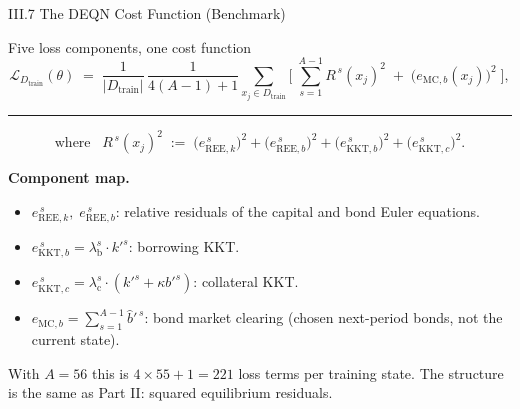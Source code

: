 \documentclass[aspectratio=169,11pt]{beamer}
\newcommand{\emphc}[1]{\textcolor{harvardcrimson}{#1}}
\newcommand{\Loss}{\mathcal{L}}
\begin{document}
\begin{frame}{III.7 The DEQN Cost Function (Benchmark)}
\footnotesize
\begin{block}{Five loss components, one cost function}
\vspace{-2pt}
\[
\Loss_{D_{\text{train}}}(\theta) \;=\; \frac{1}{|D_{\text{train}}|}\,\frac{1}{4(A-1)+1}\!
\sum_{x_j \in D_{\text{train}}}\!\Biggl[\;\sum_{s=1}^{A-1} R^{\,s}(x_j)^2 \;+\; \bigl(e_{\text{MC},b}(x_j)\bigr)^2\;\Biggr],
\]

\vspace{4pt}
\hrule
\vspace{4pt}
\[
\text{where}\;\;\;R^{\,s}(x_j)^2 \;:=\; \bigl(e_{\text{REE},k}^{\,s}\bigr)^2 + \bigl(e_{\text{REE},b}^{\,s}\bigr)^2 + \bigl(e_{\text{KKT},b}^{\,s}\bigr)^2 + \bigl(e_{\text{KKT},c}^{\,s}\bigr)^2.
\]
\vspace{-4pt}
\end{block}

\vspace{-2pt}
\textbf{Component map.}
\begin{itemize}\itemsep0pt
    \item $e_{\text{REE},k}^{\,s},\;e_{\text{REE},b}^{\,s}$: relative residuals of the capital and bond Euler equations.
    \item $e_{\text{KKT},b}^{\,s} = \lambda_{\text{b}}^s \cdot k'^s$: borrowing KKT.
    \item $e_{\text{KKT},c}^{\,s} = \lambda_{\text{c}}^s \cdot (k'^s + \kappa b'^s)$: collateral KKT.
    \item $e_{\text{MC},b} = \sum_{s=1}^{A-1} \hat b'^{\,s}$: bond market clearing (\emphc{chosen} next-period bonds, not the current state).
\end{itemize}

\vspace{0.2em}
{\scriptsize With $A = 56$ this is \emphc{$4 \times 55 + 1 = 221$} loss terms per training state.  The structure is the same as Part II: squared equilibrium residuals.}
\end{frame}
\end{document}
